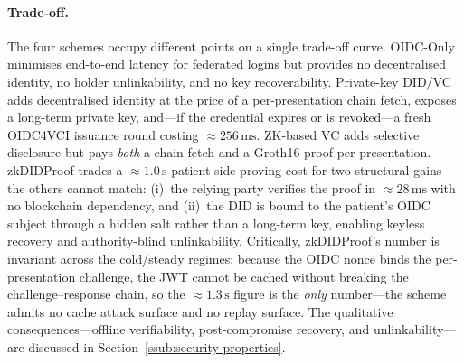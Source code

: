 \paragraph{Trade-off.}
The four schemes occupy different points on a single trade-off curve.
\textsf{OIDC-Only} minimises end-to-end latency for federated logins but
provides no decentralised identity, no holder unlinkability, and no key
recoverability. \textsf{Private-key DID/VC} adds decentralised identity at
the price of a per-presentation chain fetch, exposes a long-term private
key, and---if the credential expires or is revoked---a fresh OIDC4VCI
issuance round costing $\approx 256\,\mathrm{ms}$. \textsf{ZK-based VC}
adds selective disclosure but pays \emph{both} a chain fetch and a Groth16
proof per presentation. \textsf{zkDIDProof} trades a $\approx 1.0\,\mathrm{s}$
patient-side proving cost for two structural gains the others cannot
match: (i)~the relying party verifies the proof in $\approx 28\,\mathrm{ms}$
with no blockchain dependency, and (ii)~the DID is bound to the patient's
OIDC subject through a hidden salt rather than a long-term key, enabling
keyless recovery and authority-blind unlinkability. Critically,
\textsf{zkDIDProof}'s number is invariant across the cold/steady regimes:
because the OIDC nonce binds the per-presentation challenge, the JWT cannot
be cached without breaking the challenge--response chain, so the
$\approx 1.3\,\mathrm{s}$ figure is the \emph{only} number---the scheme
admits no cache attack surface and no replay surface.
The qualitative consequences---offline verifiability, post-compromise
recovery, and unlinkability---are discussed in
Section~\ref{ssub:security-properties}.

